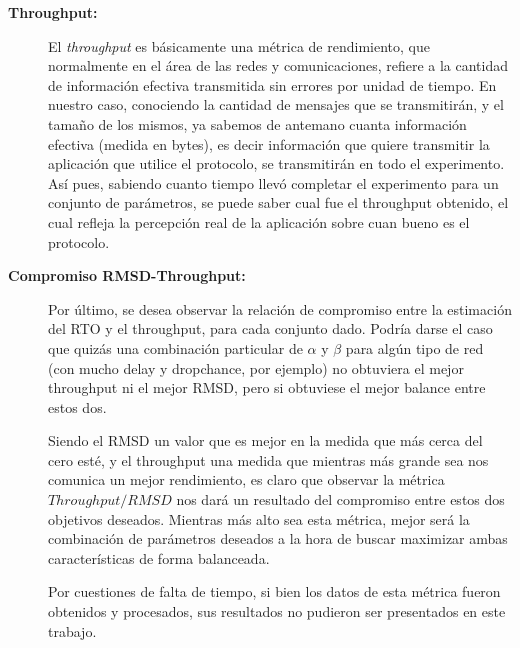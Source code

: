 \begin{description}
    \bigskip
    \item[\textbf{Throughput:}] El \emph{throughput}\cite{throughput} es
        b\'asicamente una m\'etrica de rendimiento, que normalmente en el \'area
        de las redes y comunicaciones, refiere a la cantidad de informaci\'on
        efectiva transmitida sin errores por unidad de tiempo.
        En nuestro caso, conociendo la cantidad de mensajes que se
        transmitir\'an, y el tama\~no de los mismos, ya sabemos de antemano
        cuanta informaci\'on efectiva (medida en bytes), es decir informaci\'on
        que quiere transmitir la aplicaci\'on que utilice el protocolo, se
        transmitir\'an en todo el experimento. As\'i pues, sabiendo cuanto
        tiempo llev\'o completar el experimento para un conjunto de
        par\'ametros, se puede saber cual fue el throughput obtenido, el cual
        refleja la percepci\'on real de la aplicaci\'on sobre cuan bueno es el
        protocolo.

    \bigskip
    \item[\textbf{Compromiso RMSD-Throughput:}] Por \'ultimo, se desea observar
        la relaci\'on de compromiso entre la estimaci\'on del RTO y el
        throughput, para cada conjunto dado. Podr\'ia darse el caso que quiz\'as
        una combinaci\'on particular de $\alpha$ y $\beta$ para alg\'un tipo de
        red (con mucho delay y dropchance, por ejemplo) no obtuviera el mejor
        throughput ni el mejor RMSD, pero si obtuviese el mejor balance entre
        estos dos.

        \par Siendo el RMSD un valor que es mejor en la medida que m\'as cerca
        del cero est\'e, y el throughput una medida que mientras m\'as grande sea
        nos comunica un mejor rendimiento, es claro que observar la m\'etrica
        $Throughput / RMSD$ nos dar\'a un resultado del compromiso entre estos
        dos objetivos deseados. Mientras m\'as alto sea esta m\'etrica, mejor
        ser\'a la combinaci\'on de par\'ametros deseados a la hora de buscar
        maximizar ambas caracter\'isticas de forma balanceada.

        \par Por cuestiones de falta de tiempo, si bien los datos de esta
        m\'etrica fueron obtenidos y procesados, sus resultados no pudieron ser
        presentados en este trabajo.

\end{description}

